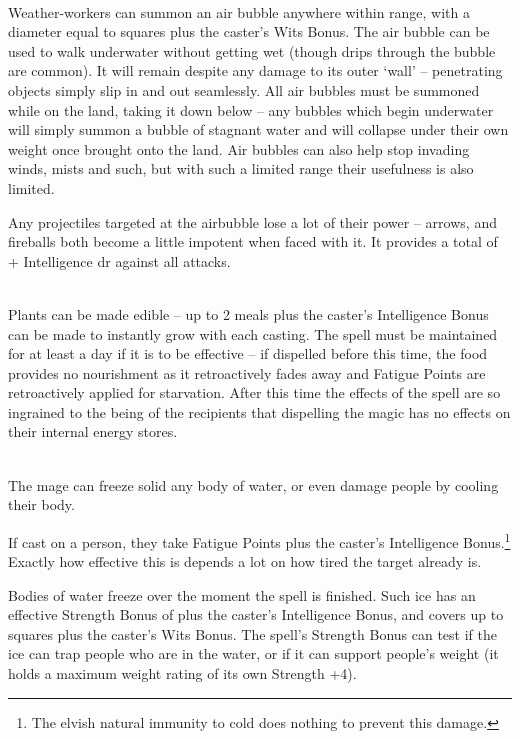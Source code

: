 \documentclass[titlepage,a4paper,openany]{book}
\begin{document}
\begin{multicols}{2}
\\
Weather-workers can summon an air bubble anywhere within range, with a diameter equal to  squares plus the caster's Wits Bonus. The air bubble can be used to walk underwater without getting wet (though drips through the bubble are common). It will remain despite any damage to its outer `wall' -- penetrating objects simply slip in and out seamlessly. All air bubbles must be summoned while on the land, taking it down below -- any bubbles which begin underwater will simply summon a bubble of stagnant water and will collapse under their own weight once brought onto the land. Air bubbles can also help stop invading winds, mists and such, but with such a limited range their usefulness is also limited.

Any projectiles targeted at the airbubble lose a lot of their power -- arrows, and fireballs both become a little impotent when faced with it.  It provides a total of  + Intelligence \gls{dr} against all attacks.

\\
Plants can be made edible -- up to 2 meals plus the caster's Intelligence Bonus can be made to instantly grow with each casting. The spell must be maintained for at least a day if it is to be effective -- if dispelled before this time, the food provides no nourishment as it retroactively fades away and Fatigue Points are retroactively applied for starvation. After this time the effects of the spell are so ingrained to the being of the recipients that dispelling the magic has no effects on their internal energy stores.

\\
The mage can freeze solid any body of water, or even damage people by cooling their body.

If cast on a person, they take  Fatigue Points plus the caster's Intelligence Bonus.\footnote{The elvish natural immunity to cold does nothing to prevent this damage.}
Exactly how effective this is depends a lot on how tired the target already is.

Bodies of water freeze over the moment the spell is finished.  Such ice has an effective Strength Bonus of  plus the caster's Intelligence Bonus, and covers up to  squares plus the caster's Wits Bonus.  The spell's Strength Bonus can test if the ice can trap people who are in the water, or if it can support people's weight (it holds a maximum weight rating of its own Strength +4).


\end{multicols}
\end{document}
